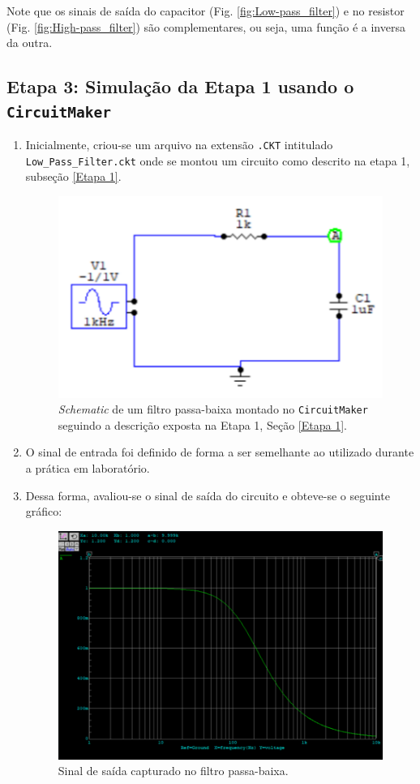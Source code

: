 \documentclass[letterpaper, 12pt]{article}
\begin{document}
\begin{enumerate}
    Note que os sinais de saída do capacitor (Fig. \ref{fig:Low-pass_filter}) e no resistor (Fig. \ref{fig:High-pass_filter}) são complementares, ou seja, uma função é a inversa da outra.
\end{enumerate}


\subsection{Etapa 3: Simulação da Etapa 1 usando o \texttt{CircuitMaker}}
\begin{enumerate}
    \item Inicialmente, criou-se um arquivo na extensão \texttt{.CKT} intitulado \texttt{Low\_Pass\_Filter.ckt} onde se montou um circuito como descrito na etapa 1, subseção \ref{Etapa 1}.
    
    \begin{figure}[h]
        \centering
        \includegraphics[width=0.5\linewidth]{figures/Low_pass.png}
        \caption{{\it Schematic} de um filtro passa-baixa montado no \texttt{CircuitMaker} seguindo a descrição exposta na Etapa 1, Seção \ref{Etapa 1}.}
        \label{Low_pass}
    \end{figure}
    
    \item O sinal de entrada foi definido de forma a ser semelhante ao utilizado durante a prática em laboratório.
    
    \item Dessa forma, avaliou-se o sinal de saída do circuito e obteve-se o seguinte gráfico:
    \begin{figure}[h]
        \centering
        \includegraphics[width=0.5\linewidth]{figures/Low_pass_filter.png}
        \caption{Sinal de saída capturado no filtro passa-baixa.}
        \label{Low_pass_filter}
    \end{figure}
    
\end{enumerate}
\end{document}
